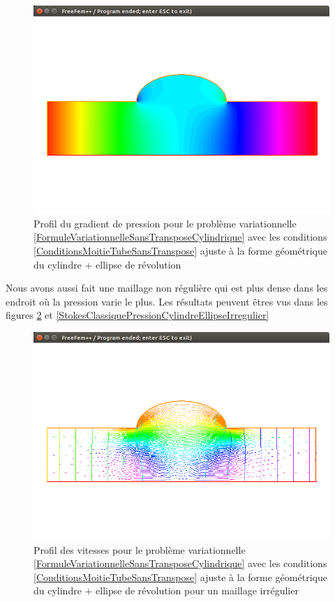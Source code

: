\documentclass[11pt,a4paper]{article}
\numberwithin{equation}{subsection}
\numberwithin{figure}{subsection}
\begin{document}
\begin{figure}[h]
\centering
\includegraphics[scale=0.4]{StokesClassiquePressionCylindreEllipse.png}
\caption{Profil du gradient de pression pour le problème variationnelle \ref{FormuleVariationnelleSansTransposeCylindrique} avec les conditions \ref{ConditionsMoitieTubeSansTranspose} ajuste à la forme géométrique du cylindre + ellipse de révolution}
\label{StokesClassiquePressionCylindreEllipse}
\end{figure}

Nous avons aussi fait une maillage non régulière qui est plus dense dans les endroit où la pression varie le plus. Les résultats peuvent êtres vus dans les figures \ref{StokesClassiqueVitessesCylindreEllipseIrregulier} et \ref{StokesClassiquePressionCylindreEllipseIrregulier}

\clearpage

\begin{figure}[h]
\centering
\includegraphics[scale=0.4]{StokesClassiqueVitessesCylindreEllipseIrregulier.png}
\caption{Profil des vitesses pour le problème variationnelle \ref{FormuleVariationnelleSansTransposeCylindrique} avec les conditions \ref{ConditionsMoitieTubeSansTranspose} ajuste à la forme géométrique du cylindre + ellipse de révolution pour un maillage irrégulier}
\label{StokesClassiqueVitessesCylindreEllipseIrregulier}
\end{figure}
\end{document}
